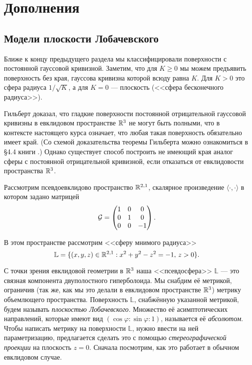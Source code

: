 \section{Дополнения}

\subsection{Модели плоскости Лобачевского}

Ближе к концу предыдущего раздела мы классифицировали поверхности с постоянной гауссовой кривизной. Заметим, что для $K \geqslant 0$ мы можем предъявить поверхность без края, гауссова кривизна которой всюду равна $K$. Для $K > 0$ это сфера радиуса $1 / \sqrt{K}$, а для $K = 0$ --- плоскость (<<сфера бесконечного радиуса>>).

Гильберт доказал, что гладкие поверхности постоянной отрицательной гауссовой кривизны в евклидовом пространстве $\mathbb{R}^3$ не могут быть полными, что в контексте настоящего курса означает, что любая такая поверхность обязательно имеет край. (Со схемой доказательства теоремы Гильберта можно ознакомиться в \S 4{.}4 книги \cite{NT14}.) Однако существует способ построить не имеющий края аналог сферы с постоянной отрицательной кривизной, если отказаться от евклидовости пространства $\mathbb{R}^3$.

Рассмотрим псевдоевклидово пространство $\mathbb{R}^{2, 1}$, скалярное произведение $\langle\cdot, \cdot\rangle$ в котором задано матрицей
\begin{equation*}
	\mathcal{G} =
	\begin{pmatrix}
		1 & 0 & 0\\
		0 & 1 & 0\\
		0 & 0 & -1
	\end{pmatrix}.
\end{equation*}

\noindent
В этом пространстве рассмотрим <<сферу мнимого радиуса>>
\[
	\mathbb{L} = \{(x, y, z) \in \mathbb{R}^{2, 1} : x^2 + y^2 - z^2 = -1,\,z > 0\}.
\]

С точки зрения евклидовой геометрии в $\mathbb{R}^3$ наша <<псевдосфера>> $\mathbb{L}$ --- это связная компонента двуполостного гиперболоида. Мы снабдим её метрикой, ограничив (так же, как мы это делали в евклидовом пространстве $\mathbb{R}^3$) метрику объемлющего пространства. Поверхность $\mathbb{L}$, снабжённую указанной метрикой, будем называть \textit{плоскостью Лобачевского}. Множество её асимптотических направлений, которые имеют вид $(\cos\varphi : \sin\varphi : 1)$, называется её \textit{абсолютом}. Чтобы написать метрику на поверхности $\mathbb{L}$, нужно ввести на ней параметризацию, предлагается сделать это с помощью \textit{стереографической проекции} на плоскость $z = 0$. Сначала посмотрим, как это работает в обычном евклидовом случае.

